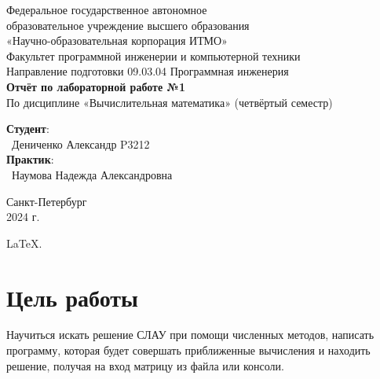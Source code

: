 \documentclass{article}
\begin{document}
\begin{center}
    \Large
    Федеральное государственное автономное \\
    образовательное учреждение высшего образования \\ 
    «Научно-образовательная корпорация ИТМО»\\
    \vspace{0.5cm}
    \large
    Факультет программной инженерии и компьютерной техники \\
    Направление подготовки 09.03.04 Программная инженерия \\
    \vspace{1cm}
    \Large
    \textbf{Отчёт по лабораторной работе №1} \\
    По дисциплине «Вычислительная математика» (четвёртый семестр)\\
    \large
    \vspace{8cm}

    \begin{minipage}{.33\textwidth}
    \end{minipage}
    \hfill
    \begin{minipage}{.4\textwidth}
    
        \textbf{Студент}: \vspace{.1cm} \\
        \ Дениченко Александр P3212\\
        \textbf{Практик}:  \\
        \ Наумова Надежда Александровна
    \end{minipage}
    \vfill
Санкт-Петербург\\ 2024 г.
\end{center}

\newpage
\begin{center}
    \LARGE
    \color{pink}
    \LaTeX \color{lime}.
\end{center}

\section{Цель работы}

Научиться искать решение СЛАУ при помощи численных методов, написать программу, которая будет совершать приближенные вычисления и находить решение, получая на вход матрицу из файла или консоли.
\end{document}
